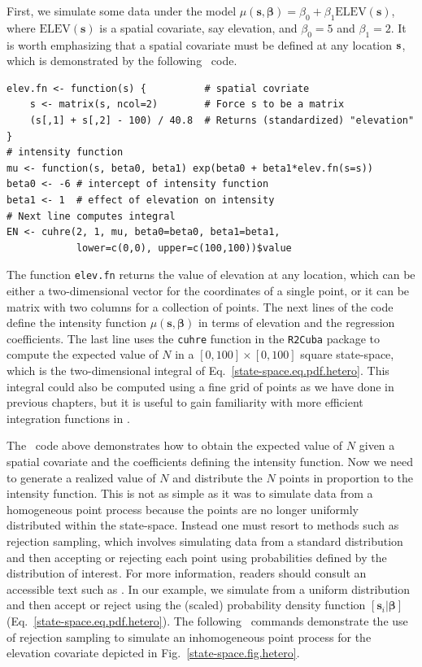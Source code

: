 First, we simulate some data under the model $\mu(\mathbf{s},
\bm{\beta}) = \beta_0 + \beta_1\mathrm{ELEV}(\mathbf{s})$, where
$\mathrm{ELEV}(\mathbf{s})$ is a spatial covariate, say
elevation, and $\beta_0=5$ and $\beta_1=2$. It is worth emphasizing
that a spatial covariate must be defined at any location $\bf s$,
which is demonstrated by the following \R~code.
\begin{samepage}
  \begin{small}
\begin{verbatim}
elev.fn <- function(s) {          # spatial covriate
    s <- matrix(s, ncol=2)        # Force s to be a matrix
    (s[,1] + s[,2] - 100) / 40.8  # Returns (standardized) "elevation"
}
# intensity function
mu <- function(s, beta0, beta1) exp(beta0 + beta1*elev.fn(s=s))
beta0 <- -6 # intercept of intensity function
beta1 <- 1  # effect of elevation on intensity
# Next line computes integral
EN <- cuhre(2, 1, mu, beta0=beta0, beta1=beta1,
            lower=c(0,0), upper=c(100,100))$value
\end{verbatim}
  \end{small}
\end{samepage}
The function \texttt{elev.fn} returns the value of elevation at any
location, which can be either a two-dimensional vector for the
coordinates of a single point, or it can be matrix with two columns
for a collection of points. The next lines of the code define the
intensity function $\mu(\mathbf{s}, \bm{\beta})$ in terms of elevation
and the regression coefficients. The last line uses the \verb+cuhre+ function in
the {\tt R2Cuba} package \citep{hahn_etal:2011} to compute the
expected value of $N$ in a $[0,100]\times[0,100]$ square state-space, which is the
two-dimensional integral of Eq.~\ref{state-space.eq.pdf.hetero}. This
integral could also be computed using a fine grid of points as we have done in previous
chapters, but it is useful to gain familiarity with more efficient
integration functions in \R.

The \R~code above demonstrates how to obtain the expected value
of $N$ given a spatial covariate and the coefficients defining the
intensity function. Now we need to generate a realized value of $N$
and distribute the $N$ points in proportion to the intensity
function. This is not as simple as it was to simulate data from a homogeneous point process
because the points are no longer uniformly distributed within the
state-space. Instead one must resort to methods such as rejection sampling, which involves
simulating data from a standard distribution and then accepting or
rejecting each point using probabilities defined by the distribution
of interest. For more information, readers should consult an
accessible text such as \citet{robert_casella:2010}. In our example, we
simulate from a uniform distribution and then accept or reject using
the (scaled) probability density function
$[\mathbf{s}_i | \bm{\beta}]$
(Eq.~\ref{state-space.eq.pdf.hetero}). The following \R~commands
demonstrate the use of
rejection sampling to simulate an inhomogeneous point process for the
elevation covariate depicted in
Fig.~\ref{state-space.fig.hetero}.

